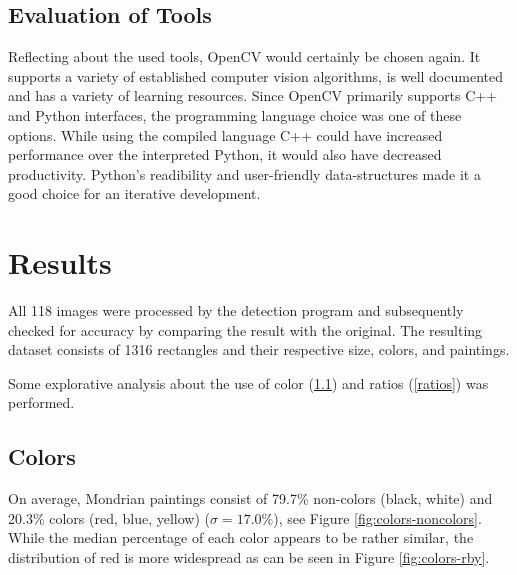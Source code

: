 \documentclass[serif,article,noparskip]{agse-thesis}
\begin{document}
\subsection{Evaluation of Tools} \label{evaluation}

Reflecting about the used tools, OpenCV would certainly be chosen again. It
supports a variety of established computer vision algorithms, is well documented
and has a variety of learning resources. Since OpenCV primarily supports C++ and
Python interfaces, the programming language choice was one of these options.
While using the compiled language C++ could have increased performance over the
interpreted Python, it would also have decreased productivity. Python's
readibility and user-friendly data-structures made it a good choice for an
iterative development.

\section{Results} \label{results}

 All 118 images were processed by the detection program and subsequently checked
 for accuracy by comparing the result with the original. The resulting dataset
 consists of 1316 rectangles and their respective size, colors, and paintings.

Some explorative analysis about the use of color (\ref{color}) and ratios
(\ref{ratios}) was performed.

\subsection{Colors} \label{color}

On average, Mondrian paintings consist of 79.7\% non-colors (black, white) and
20.3\% colors (red, blue, yellow) ($\sigma = 17.0\%$), see Figure
\ref{fig:colors-noncolors}. While the median percentage of each color appears to
be rather similar, the distribution of red is more widespread as can be seen in
Figure \ref{fig:colors-rby}.
\end{document}
